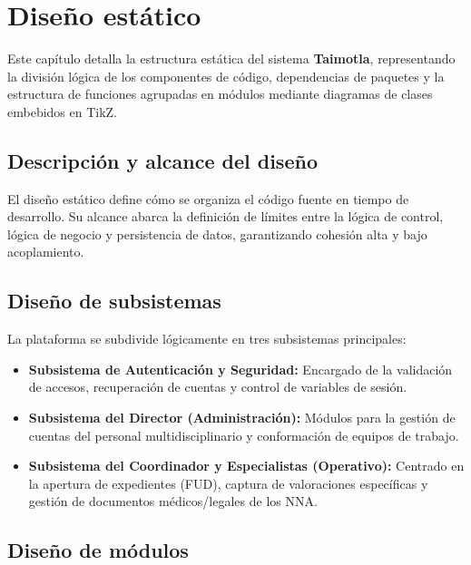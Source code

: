 \chapter{Diseño estático}
\label{cap:disenoEstatico}

Este capítulo detalla la estructura estática del sistema \textbf{Taimotla}, representando la división lógica de los componentes de código, dependencias de paquetes y la estructura de funciones agrupadas en módulos mediante diagramas de clases embebidos en TikZ.

\section{Descripción y alcance del diseño}
\label{sec:descripcionAlcanceEstatico}

El diseño estático define cómo se organiza el código fuente en tiempo de desarrollo. Su alcance abarca la definición de límites entre la lógica de control, lógica de negocio y persistencia de datos, garantizando cohesión alta y bajo acoplamiento.

\section{Diseño de subsistemas}
\label{sec:disenoSubsistemas}

La plataforma se subdivide lógicamente en tres subsistemas principales:

\begin{itemize}
    \item \textbf{Subsistema de Autenticación y Seguridad:} Encargado de la validación de accesos, recuperación de cuentas y control de variables de sesión.
    \item \textbf{Subsistema del Director (Administración):} Módulos para la gestión de cuentas del personal multidisciplinario y conformación de equipos de trabajo.
    \item \textbf{Subsistema del Coordinador y Especialistas (Operativo):} Centrado en la apertura de expedientes (FUD), captura de valoraciones específicas y gestión de documentos médicos/legales de los NNA.
\end{itemize}

\section{Diseño de módulos}
\label{sec:disenoModulos}


